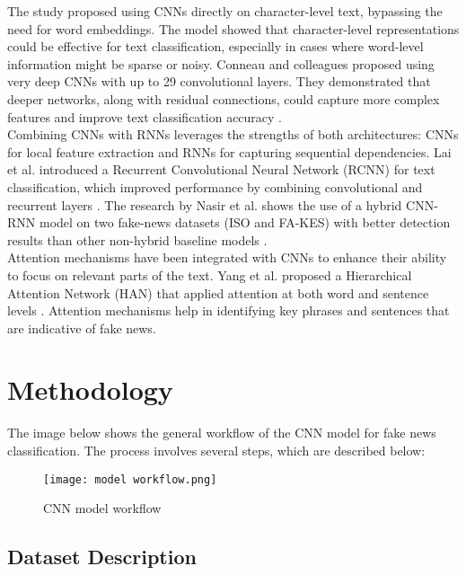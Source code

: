 The study \cite{zhang2016characterlevel} proposed using CNNs directly on character-level text, bypassing the need for word embeddings. The model showed that character-level representations could be effective for text classification, especially in cases where word-level information might be sparse or noisy. Conneau and colleagues proposed using very deep CNNs with up to 29 convolutional layers. They demonstrated that deeper networks, along with residual connections, could capture more complex features and improve text classification accuracy \cite{conneau2017deep}.\\

Combining CNNs with RNNs leverages the strengths of both architectures: CNNs for local feature extraction and RNNs for capturing sequential dependencies. Lai et al. introduced a Recurrent Convolutional Neural Network (RCNN) for text classification, which improved performance by combining convolutional and recurrent layers  \cite{Lai2015RecurrentCN}.  The research by Nasir et al. shows the use of a hybrid CNN-RNN model on two fake-news datasets (ISO and FA-KES) with better detection results than other non-hybrid baseline models \cite{hybrid-cnn-rnn}.\\

Attention mechanisms have been integrated with CNNs to enhance their ability to focus on relevant parts of the text. Yang et al. proposed a Hierarchical Attention Network (HAN) that applied attention at both word and sentence levels  \cite{yang-etal-2016-hierarchical}.  Attention mechanisms help in identifying key phrases and sentences that are indicative of fake news. \\

\clearpage
\section{Methodology}

The image below shows the general workflow of the CNN model for fake news classification. The process involves several steps, which are described below:

\begin{figure}[h]
    \centering
    \texttt{[image: model workflow.png]}
    \caption{CNN model workflow}
    \label{fig:cnn workflow}
\end{figure}

\clearpage
\subsection{Dataset Description}

